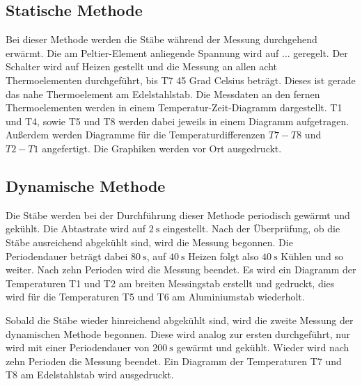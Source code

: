 \subsection{Statische Methode}
\label{sec:statische methode}
Bei dieser Methode werden die Stäbe während der Messung durchgehend erwärmt. Die
am Peltier-Element anliegende Spannung wird auf ... geregelt. Der Schalter wird
auf Heizen gestellt und die Messung an allen acht Thermoelementen durchgeführt, bis
T7 45 Grad Celsius beträgt. Dieses ist gerade das nahe Thermoelement am Edelstahlstab.
Die Messdaten an den fernen Thermoelementen werden in einem Temperatur-Zeit-Diagramm dargestellt.
T1 und T4, sowie T5 und T8 werden dabei jeweils in einem Diagramm aufgetragen.
Außerdem werden Diagramme für die Temperaturdifferenzen $T7 - T8$ und $T2 - T1$
angefertigt. Die Graphiken werden vor Ort ausgedruckt.

\subsection{Dynamische Methode}
\label{sec:dynamische methode}
Die Stäbe werden bei der Durchführung dieser Methode periodisch gewärmt und gekühlt.
Die Abtastrate wird auf $\SI{2}{\second}$ eingestellt. Nach der Überprüfung, ob die
Stäbe ausreichend abgekühlt sind, wird die Messung begonnen. Die Periodendauer beträgt
dabei $\SI{80}{\second}$, auf $\SI{40}{\second}$ Heizen folgt also $\SI{40}{\second}$ Kühlen
und so weiter. Nach zehn Perioden wird die Messung beendet. Es wird ein Diagramm
der Temperaturen T1 und T2 am breiten Messingstab erstellt und gedruckt, dies wird
für die Temperaturen T5 und T6 am Aluminiumstab wiederholt.

Sobald die Stäbe wieder hinreichend abgekühlt sind, wird die zweite Messung der
dynamischen Methode begonnen. Diese wird analog zur ersten durchgeführt, nur wird
mit einer Periodendauer von $\SI{200}{\second}$ gewärmt und gekühlt.
Wieder wird nach zehn Perioden die Messung beendet. Ein Diagramm der Temperaturen T7 und T8
am Edelstahlstab wird ausgedruckt.
